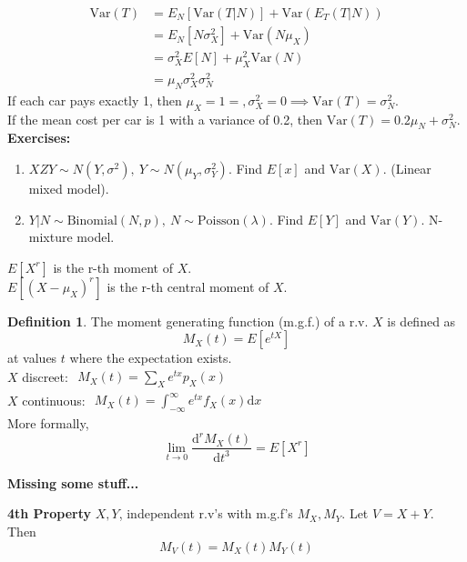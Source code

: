\documentclass{article}
\theoremstyle{definition}
\newtheorem{definition}{Definition}[section]
\theoremstyle{remark}
\theoremstyle{example}
\renewcommand{\d}{\mathrm{d}}
\newcommand{\dv}[2]{\frac{\d #1}{\d #2}}
\newcommand{\Var}[1]{\mathrm{Var}\left(#1\right)}
\newcommand{\Binomial}[1]{\mathrm{Binomial}\left(#1\right)}
\newcommand{\Poisson}[1]{\mathrm{Poisson}\left(#1\right)}
\begin{document}
	\begin{align*}
		\Var{T}&=E_N[\Var{T|N}]+\Var{E_T(T|N)}\\
		&=E_N[N\sigma^2_X]+\Var{N\mu_X}\\
		&=\sigma^2_X E[N]+\mu_X^2\Var{N}\\
		&=\mu_N \sigma_X^2\sigma^2_N
	\end{align*}
	If each car pays exactly 1, then $\mu_X=1=, \sigma_X^2=0 \implies \Var{T}=\sigma^2_N$.\\
	If the mean cost per car is 1 with a variance of 0.2, then $\Var{T}=0.2 \mu_N+\sigma_N^2$.\\
	\textbf{Exercises:}
	\begin{enumerate}
		\item $XZY \sim N(Y,\sigma^2),\ Y \sim N(\mu_Y,\sigma^2_Y)$. Find $E[x]$ and $\Var{X}$. (Linear mixed model).
		\item $Y|N \sim \Binomial{N,p},\ N \sim \Poisson{\lambda}$. Find $E[Y]$ and $\Var{Y}$. N-mixture model.
	\end{enumerate}

	$E[X^r]$ is the r-th moment of $X$.\\
	$E[(X-\mu_X)^r]$ is the r-th central moment of $X$.
	\pagebreak
	\begin{definition}
		The moment generating function (m.g.f.) of a r.v. $X$ is defined as \[ M_X(t)=E[e^{tX}] \] at values $t$ where the expectation exists.\\
		$X$ discreet: $\begin{aligned}
			M_X(t)=\sum_X e^{tx}p_X(x)
		\end{aligned}$\\
		$X$ continuous: $\begin{aligned}
			M_X(t)=\int_{-\infty}^{\infty}e^{tx}f_X(x) \d x
		\end{aligned}$\\
		More formally, \[ \lim\limits_{t \to 0} \dv{^rM_X(t)}{t^3}=E[X^r] \]
	\end{definition}
	\textbf{Missing some stuff...}
	
	\textbf{4th Property}
	$X,Y$, independent r.v's with m.g.f's $M_X, M_Y$. Let $V=X+Y$. Then \[M_V(t)=M_X(t)M_Y(t)\]
	
\end{document}
